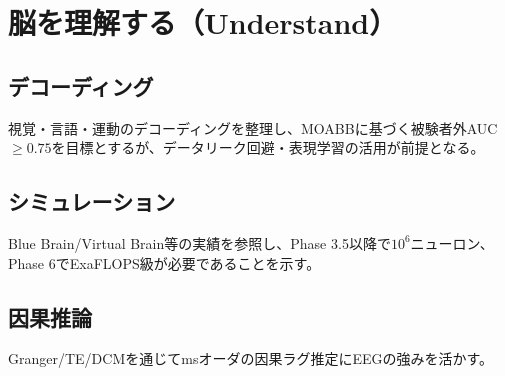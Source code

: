\chapter{脳を理解する（Understand）}
\section{デコーディング}
視覚・言語・運動のデコーディングを整理し、MOABBに基づく被験者外AUC\(\geq 0.75\)を目標とするが、データリーク回避・表現学習の活用が前提となる。

\section{シミュレーション}
Blue Brain/Virtual Brain等の実績を参照し、Phase 3.5以降で\(10^6\)ニューロン、Phase 6でExaFLOPS級が必要であることを示す。

\section{因果推論}
Granger/TE/DCMを通じてmsオーダの因果ラグ推定にEEGの強みを活かす。


